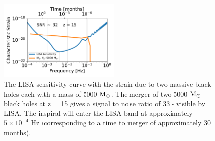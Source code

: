 \documentclass[graphics, twocolumn, usenatbib]{mn2e}
\newcommand{\msolar} {$\rm{M_{\odot}}~$}
\newcommand{\msolarc} {$\rm{M_{\odot}}$}
\begin{document}
\begin{figure}
   \centering 
\includegraphics[width=0.525\textwidth]{FIGURES/Sensitivity.pdf}
\caption{The LISA sensitivity curve with the strain due to two massive black holes each with a mass
  of 5000 \msolarc. The merger of two 5000 \msolar black holes at z = 15 gives a
  signal to noise ratio of 33 - visible by LISA. The inspiral will enter the LISA band at
  approximately $5 \times 10^{-4}$ Hz (corresponding to a time to merger of approximately 30 months).}
\label{Fig:Sensitivity}
\end{figure}


\label{lastpage}


\end{document}

